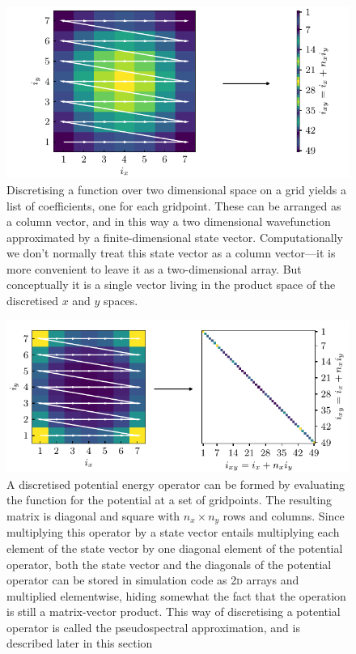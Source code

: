 \begin{figure}[t]
    \centerfloat
    \includegraphics[width=\textwidth]{figures/numerics/vector_unravel.pdf}
    \caption{Discretising a function over two dimensional space on a grid yields a list of coefficients, one for each gridpoint. These can be arranged as a column vector, and in this way a two dimensional wavefunction approximated by a finite-dimensional state vector. Computationally we don't normally treat this state vector as a column vector---it is more convenient to leave it as a two-dimensional array. But conceptually it is a single vector living in the product space of the discretised $x$ and $y$ spaces.}
    \label{fig:vector_unravel}
\end{figure}

\begin{figure}[t]
    \centerfloat
    \includegraphics[width=\textwidth]{figures/numerics/potential_unravel.pdf}
    \caption{A discretised potential energy operator can be formed by evaluating the function for the potential at a set of gridpoints. The resulting matrix is diagonal and square with $n_x \times n_y$ rows and columns. Since multiplying this operator by a state vector entails multiplying each element of the state vector by one diagonal element of the potential operator, both the state vector and the diagonals of the potential operator can be stored in simulation code as 2\textsc{d} arrays and multiplied elementwise, hiding somewhat the fact that the operation is still a matrix-vector product. This way of discretising a potential operator is called the pseudospectral approximation, and is described later in this section}
    \label{fig:potential_unravel}
\end{figure}

